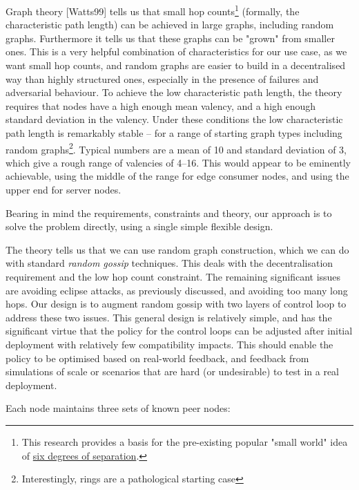 \documentclass[11pt,a4paper]{article}
\begin{document}
Graph theory {[}Watts99{]} tells us that small hop counts\footnote{This
  research provides a basis for the pre-existing popular "small world"
  idea of
  \href{https://en.wikipedia.org/wiki/Six_degrees_of_separation\#Computer_networks}{{six
  degrees of separation}}.} (formally, the characteristic path length)
can be achieved in large graphs, including random graphs. Furthermore it
tells us that these graphs can be "grown" from smaller ones. This is a
very helpful combination of characteristics for our use case, as we want
small hop counts, and random graphs are easier to build in a
decentralised way than highly structured ones, especially in the
presence of failures and adversarial behaviour. To achieve the low
characteristic path length, the theory requires that nodes have a high
enough mean valency, and a high enough standard deviation in the
valency. Under these conditions the low characteristic path length is
remarkably stable -- for a range of starting graph types including
random graphs\footnote{Interestingly, rings are a pathological starting
  case}. Typical numbers are a mean of 10 and standard deviation of 3,
which give a rough range of valencies of 4--16. This would appear to be
eminently achievable, using the middle of the range for edge consumer
nodes, and using the upper end for server nodes.

Bearing in mind the requirements, constraints and theory, our approach
is to solve the problem directly, using a single simple flexible design.

The theory tells us that we can use random graph construction, which we
can do with standard \emph{random gossip} techniques. This deals with
the decentralisation requirement and the low hop count constraint. The
remaining significant issues are avoiding eclipse attacks, as previously
discussed, and avoiding too many long hops. Our design is to augment
random gossip with two layers of control loop to address these two
issues. This general design is relatively simple, and has the
significant virtue that the policy for the control loops can be adjusted
after initial deployment with relatively few compatibility impacts. This
should enable the policy to be optimised based on real-world feedback,
and feedback from simulations of scale or scenarios that are hard (or
undesirable) to test in a real deployment.

Each node maintains three sets of known peer nodes:
\end{document}
